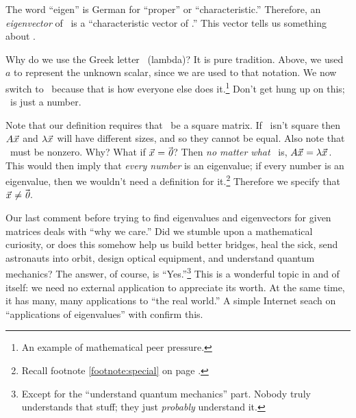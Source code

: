 
The word ``eigen'' is German for ``proper'' or ``characteristic.'' Therefore, an \textit{eigenvector} of \tta\ is a ``characteristic vector of \tta.'' This vector tells us something about \tta. 

Why do we use the Greek letter \lda\ (lambda)? It is pure tradition. Above, we used $a$ to represent the unknown scalar, since we are used to that notation. We now switch to \lda\ because that is how everyone else does it.\footnote{An example of mathematical peer pressure.} %
 Don't get hung up on this; \lda\ is just a number.

Note that our definition requires that \tta\ be a square matrix.
If \tta\ isn't square then $A\vec{x_{}}$ and $\lambda\vec{x_{}}$ will have different sizes, and so they cannot be equal. Also note that \vx\ must be nonzero. Why? What if $\vec{x_{}} = \vec{\text{\it 0}}$? Then \textit{no matter what} \lda\ is, $A\vec{x_{}} = \lambda\vec{x_{}}$. This would then imply that \textit{every number} is an eigenvalue; if every number is an eigenvalue, then we wouldn't need a definition for 
it.\footnote{Recall footnote \ref{footnote:special} on page \pageref{footnote:special}.} Therefore we specify that $\vec{x_{}}\neq \vec{\text{\it 0}}$.

Our last comment before trying to find eigenvalues and eigenvectors for given matrices deals with ``why we care.'' Did we stumble upon a mathematical curiosity, or does this somehow help us build better bridges, heal the sick, send astronauts into orbit, design optical equipment, and understand quantum mechanics? The answer, of course, is ``Yes.''\footnote{Except for the ``understand quantum mechanics'' part. Nobody truly understands that stuff; they just \textit{probably} understand it.} This is a wonderful topic in and of itself: we need no external application to appreciate its worth. At the same time, it has many, many applications to ``the real world.'' A simple Internet seach on ``applications of eigenvalues'' with confirm this.

